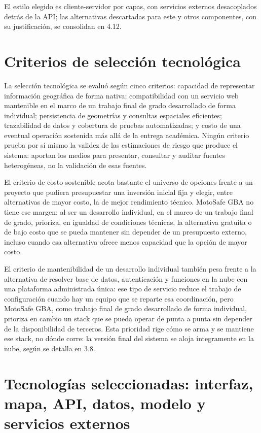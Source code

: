 El estilo elegido es cliente-servidor por capas, con servicios externos
desacoplados detrás de la API; las alternativas descartadas para este y
otros componentes, con su justificación, se consolidan en 4.12.

\section{Criterios de selección tecnológica}

La selección tecnológica se evaluó según cinco criterios: capacidad de
representar información geográfica de forma nativa; compatibilidad con
un servicio web mantenible en el marco de un trabajo final de grado
desarrollado de forma individual; persistencia de geometrías y consultas
espaciales eficientes; trazabilidad de datos y cobertura de pruebas
automatizadas; y costo de una eventual operación sostenida más allá de
la entrega académica. Ningún criterio prueba por sí mismo la validez de
las estimaciones de riesgo que produce el sistema: aportan los medios
para presentar, consultar y auditar fuentes heterogéneas, no la
validación de esas fuentes.

El criterio de costo sostenible acota bastante el universo de opciones
frente a un proyecto que pudiera presupuestar una inversión inicial fija
y elegir, entre alternativas de mayor costo, la de mejor rendimiento
técnico. MotoSafe GBA no tiene ese margen: al ser un desarrollo
individual, en el marco de un trabajo final de grado, prioriza, en
igualdad de condiciones técnicas, la alternativa gratuita o de bajo
costo que se pueda mantener sin depender de un presupuesto externo,
incluso cuando esa alternativa ofrece menos capacidad que la opción de
mayor costo.

El criterio de mantenibilidad de un desarrollo individual también pesa
frente a la alternativa de resolver base de datos, autenticación y
funciones en la nube con una plataforma administrada única: ese tipo de
servicio reduce el trabajo de configuración cuando hay un equipo que se
reparte esa coordinación, pero MotoSafe GBA, como trabajo final de grado
desarrollado de forma individual, prioriza en cambio un stack que se
pueda operar de punta a punta sin depender de la disponibilidad de
terceros. Esta prioridad rige cómo se arma y se mantiene ese stack, no
dónde corre: la versión final del sistema se aloja íntegramente en la
nube, según se detalla en 3.8.

\section{Tecnologías seleccionadas: interfaz, mapa, API, datos, modelo y servicios externos}

